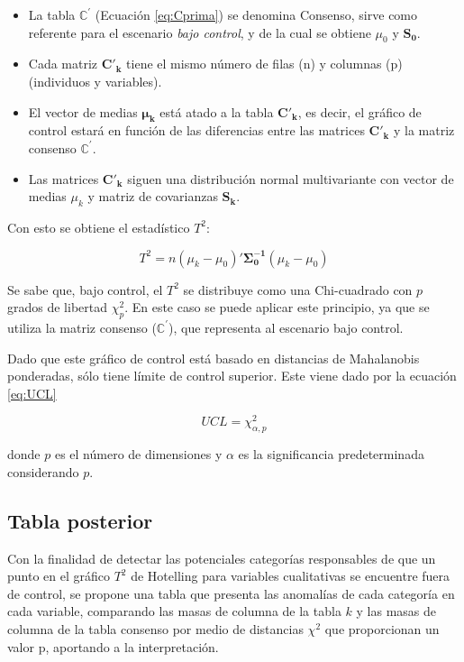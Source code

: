\documentclass[water,article,submit,moreauthors,pdftex]{mdpi}
\providecommand{\tightlist}{%
  \setlength{\itemsep}{0pt}\setlength{\parskip}{4pt}}
\begin{document}
\begin{itemize}
\tightlist
\item
  La tabla \(\mathbb{C}^{'}\) (Ecuación \ref{eq:Cprima}) se denomina
  Consenso, sirve como referente para el escenario \emph{bajo control},
  y de la cual se obtiene \(\mu_{0}\) y \(\mathbf{S_0}\).\\
\item
  Cada matriz \(\mathbf{C'_k}\) tiene el mismo número de filas (n) y
  columnas (p) (individuos y variables).
\item
  El vector de medias \(\mathbf{\mu_k}\) está atado a la tabla
  \(\mathbf{C'_k}\), es decir, el gráfico de control estará en función
  de las diferencias entre las matrices \(\mathbf{C'_k}\) y la matriz
  consenso \(\mathbf{\mathbb{C^{'}}}\).
\item
  Las matrices \(\mathbf{C'_k}\) siguen una distribución normal
  multivariante con vector de medias \(\mu_{k}\) y matriz de covarianzas
  \(\mathbf{S_k}\).
\end{itemize}

Con esto se obtiene el estadístico \(T^2\):

\begin{equation}
T^2=n (\mu_{k}-\mu_{0})'\mathbf{\Sigma_{0}^{-1}}(\mu_{k}-\mu_{0})
\label{eq:T2}
\end{equation}

Se sabe que, bajo control, el \(T^2\) se distribuye como una
Chi-cuadrado con \(p\) grados de libertad \(\chi^2_p\). En este caso se
puede aplicar este principio, ya que se utiliza la matriz consenso
(\(\mathbb{C}^{'}\)), que representa al escenario bajo control.

Dado que este gráfico de control está basado en distancias de
Mahalanobis ponderadas, sólo tiene límite de control superior. Este
viene dado por la ecuación \ref{eq:UCL}

\begin{equation}
UCL=\chi^2_{\alpha,p}
\label{eq:UCL}
\end{equation}

donde \(p\) es el número de dimensiones y \(\alpha\) es la significancia
predeterminada considerando \(p\).

\hypertarget{tabla-posterior}{%
\subsection{Tabla posterior}\label{tabla-posterior}}

Con la finalidad de detectar las potenciales categorías responsables de
que un punto en el gráfico \(T^2\) de Hotelling para variables
cualitativas se encuentre fuera de control, se propone una tabla que
presenta las anomalías de cada categoría en cada variable, comparando
las masas de columna de la tabla \(k\) y las masas de columna de la
tabla consenso por medio de distancias \(\chi^2\) que proporcionan un
valor p, aportando a la interpretación.
\end{document}
